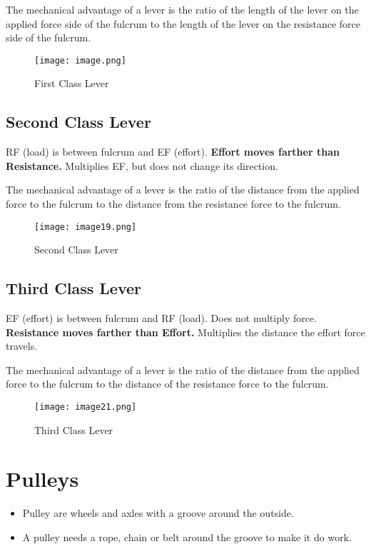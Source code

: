 \documentclass[12pt]{scrartcl}
\begin{document}
\bigskip \noindent The mechanical advantage of a lever is the ratio of the length of the lever on the applied force side of the fulcrum to the length of the lever on the resistance force side of the fulcrum.

\begin{figure}[htp]
    \centering
    \texttt{[image: image.png]}
    \caption{First Class Lever}
\end{figure}

\subsection{Second Class Lever} 
RF (load) is between fulcrum and EF (effort). \textbf{Effort moves farther than Resistance.} Multiplies EF, but does not change its direction.

\bigskip \noindent The mechanical advantage of a lever is the ratio of the distance from the applied force to the fulcrum to the distance from the resistance force to the fulcrum.

\begin{figure}[htp]
    \centering
    \texttt{[image: image19.png]}
    \caption{Second Class Lever}
\end{figure}

\subsection{Third Class Lever}
EF (effort) is between fulcrum and RF (load). Does not multiply force. \textbf{Resistance moves farther than Effort.} Multiplies the distance the effort force travels.

\bigskip \noindent The mechanical advantage of a lever is the ratio of the distance from the applied force to the fulcrum to the distance of the resistance force to the fulcrum.

\begin{figure}[htp]
    \centering
    \texttt{[image: image21.png]}
    \caption{Third Class Lever}
\end{figure}

\section{Pulleys}
\begin{itemize}
    \item Pulley are wheels and axles with a groove around the outside.
    \item A pulley needs a rope, chain or belt around the groove to make it do work.
\end{itemize}
\end{document}
